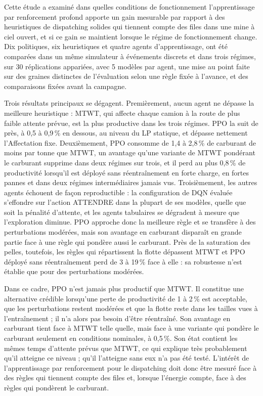 \documentclass[11pt,a4paper]{article}
\newif\ifrevmarks
\newcommand{\revtag}[1]{\ifrevmarks\textsuperscript{\textcolor{red!70!black}{\scriptsize[#1]}}\fi}
\newenvironment{revbloc}[1]{\par\ifrevmarks\color{revcolor}\noindent\revtag{#1}\ \fi}{\par}
\newif\ifcorrmarks
\newcommand{\corr}[1]{\ifcorrmarks\textcolor{corrcolor}{#1}\else#1\fi}
\begin{document}
\begin{revbloc}{T31}
\corr{Cette étude a examiné dans quelles conditions de fonctionnement l'apprentissage par renforcement profond apporte un gain mesurable par rapport à des heuristiques de dispatching solides qui tiennent compte des files dans une mine à ciel ouvert, et si ce gain se maintient lorsque le régime de fonctionnement change.} Dix politiques, six heuristiques et quatre agents d'apprentissage, ont été comparées dans un même simulateur à événements discrets et dans trois régimes, sur 30 réplications appariées, avec 5 modèles par agent, une mise au point faite sur des graines distinctes de l'évaluation selon une règle fixée à l'avance, et des comparaisons fixées avant la campagne.

Trois résultats principaux se dégagent. Premièrement, aucun agent ne dépasse la meilleure heuristique : MTWT, qui affecte chaque camion à la route de plus faible attente prévue, est la plus productive dans les trois régimes. PPO la suit de près, à 0,5 à 0,9\,\% en dessous, au niveau du \corr{LP statique}, et dépasse nettement l'Affectation fixe. Deuxièmement, PPO consomme de 1,4 à 2,8\,\% de carburant de moins par tonne que MTWT\corr{, un avantage qu'une variante de MTWT pondérant le carburant supprime dans deux régimes sur trois}, et \corr{il perd au plus 0,8\,\% de productivité} lorsqu'il est déployé sans réentraînement en forte charge, en fortes pannes et dans deux régimes intermédiaires jamais vus. Troisièmement, les autres agents échouent de façon reproductible : \corr{la configuration de DQN évaluée} s'effondre sur l'action \corr{ATTENDRE} dans la plupart de ses modèles, quelle que soit la pénalité d'attente, et les agents tabulaires se dégradent à mesure que l'exploration diminue. \corr{PPO approche donc la meilleure règle et se transfère à des perturbations modérées, mais son avantage en carburant disparaît en grande partie face à une règle qui pondère aussi le carburant.} \corr{Près de la saturation des pelles, toutefois, les règles qui répartissent la flotte dépassent MTWT et PPO déployé sans réentraînement perd de 3 à 19\,\% face à elle : sa robustesse n'est établie que pour des perturbations modérées.}

\corr{Dans ce cadre, PPO n'est jamais plus productif que MTWT. Il constitue une alternative crédible lorsqu'une perte de productivité de 1 à 2\,\% est acceptable, que les perturbations restent modérées et que la flotte reste dans les tailles vues à l'entraînement ; il n'a alors pas besoin d'être réentraîné. Son avantage en carburant tient face à MTWT telle quelle, mais face à une variante qui pondère le carburant seulement en conditions nominales, à 0,5\,\%. Son état contient les mêmes temps d'attente prévus que MTWT, ce qui explique très probablement qu'il atteigne ce niveau ; qu'il l'atteigne sans eux n'a pas été testé. L'intérêt de l'apprentissage par renforcement pour le dispatching doit donc être mesuré face à des règles qui tiennent compte des files et, lorsque l'énergie compte, face à des règles qui pondèrent le carburant.}


\end{revbloc}
\end{document}
